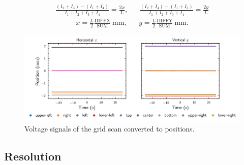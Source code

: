 \begin{align}
	\frac{(I_2+I_3)-(I_1+I_4)}{I_1+I_2+I_3+I_4}=\frac{2x}{L},
	&&
	\frac{(I_2+I_4)-(I_1+I_3)}{I_1+I_2+I_3+I_4}=\frac{2y}{L}
	\label{eq:position_conversion_photocurrent}
\end{align}
\begin{align}
	x=\frac{L}{2}\frac{\text{DIFFX}}{\text{SUM}}\ \si{\milli\meter}, &&
	y=\frac{L}{2}\frac{\text{DIFFY}}{\text{SUM}}\ \si{\milli\meter}.
	\label{eq:position_conversion_voltages}
\end{align}

\begin{figure}[htb]
	\centering
	\includegraphics[scale=0.7]{figure/plot/positions}
	\caption{Voltage signals of the grid scan converted to positions.}\label{fig:grid_scan_x}
\end{figure}


\subsection{Resolution}


